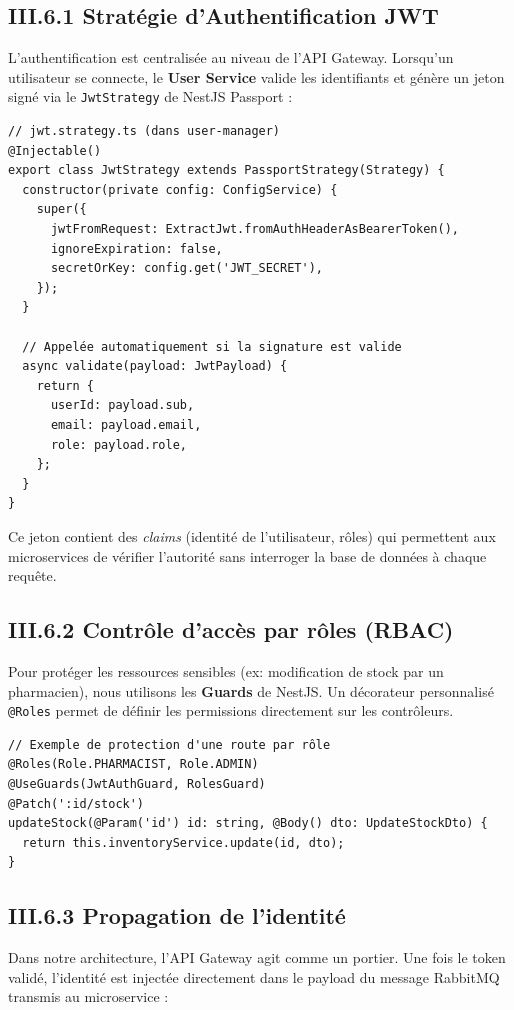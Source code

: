 \subsection{III.6.1 Stratégie d'Authentification JWT}
L'authentification est centralisée au niveau de l'API Gateway. Lorsqu'un utilisateur se connecte, le \textbf{User Service} valide les identifiants et génère un jeton signé via le \texttt{JwtStrategy} de NestJS Passport :

\begin{verbatim}
// jwt.strategy.ts (dans user-manager)
@Injectable()
export class JwtStrategy extends PassportStrategy(Strategy) {
  constructor(private config: ConfigService) {
    super({
      jwtFromRequest: ExtractJwt.fromAuthHeaderAsBearerToken(),
      ignoreExpiration: false,
      secretOrKey: config.get('JWT_SECRET'),
    });
  }

  // Appelée automatiquement si la signature est valide
  async validate(payload: JwtPayload) {
    return {
      userId: payload.sub,
      email: payload.email,
      role: payload.role,
    };
  }
}
\end{verbatim}

Ce jeton contient des \textit{claims} (identité de l'utilisateur, rôles) qui permettent aux microservices de vérifier l'autorité sans interroger la base de données à chaque requête.

\subsection{III.6.2 Contrôle d'accès par rôles (RBAC)}
Pour protéger les ressources sensibles (ex: modification de stock par un pharmacien), nous utilisons les \textbf{Guards} de NestJS. Un décorateur personnalisé \texttt{@Roles} permet de définir les permissions directement sur les contrôleurs.

\begin{verbatim}
// Exemple de protection d'une route par rôle
@Roles(Role.PHARMACIST, Role.ADMIN)
@UseGuards(JwtAuthGuard, RolesGuard)
@Patch(':id/stock')
updateStock(@Param('id') id: string, @Body() dto: UpdateStockDto) {
  return this.inventoryService.update(id, dto);
}
\end{verbatim}

\subsection{III.6.3 Propagation de l'identité}
Dans notre architecture, l'API Gateway agit comme un portier. Une fois le token validé, l'identité est injectée directement dans le payload du message RabbitMQ transmis au microservice :

